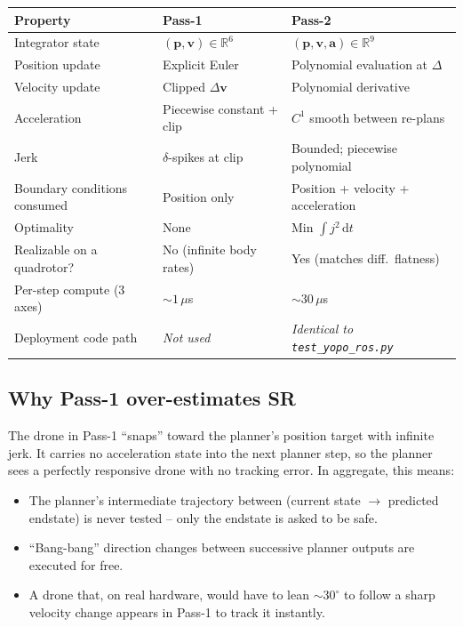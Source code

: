 \documentclass[11pt]{article}
\newcommand{\R}{\mathbb{R}}
\newcommand{\dt}{\,\mathrm{d}t}
\begin{document}
\begin{center}
\begin{tabular}{lll}
\hline
Property & Pass-1 & Pass-2 \\
\hline
Integrator state                & $(\bm{p}, \bm{v}) \in \R^6$ & $(\bm{p}, \bm{v}, \bm{a}) \in \R^9$ \\
Position update                 & Explicit Euler & Polynomial evaluation at $\Delta$ \\
Velocity update                 & Clipped $\Delta\bm{v}$ & Polynomial derivative \\
Acceleration                    & Piecewise constant + clip & $C^1$ smooth between re-plans \\
Jerk                            & $\delta$-spikes at clip   & Bounded; piecewise polynomial \\
Boundary conditions consumed    & Position only            & Position + velocity + acceleration \\
Optimality                      & None                     & Min $\int j^2 \dt$ \\
Realizable on a quadrotor?      & No (infinite body rates) & Yes (matches diff.\ flatness) \\
Per-step compute (3 axes)       & ${\sim}1\,\mu$s          & ${\sim}30\,\mu$s \\
Deployment code path            & \emph{Not used}          & \emph{Identical to \texttt{test\_yopo\_ros.py}} \\
\hline
\end{tabular}
\end{center}

\subsection{Why Pass-1 over-estimates SR}

The drone in Pass-1 ``snaps'' toward the planner's position target with infinite jerk.  It carries no acceleration state into the next planner step, so the planner sees a perfectly responsive drone with no tracking error.  In aggregate, this means:

\begin{itemize}
  \item The planner's intermediate trajectory between (current state $\to$ predicted endstate) is never tested -- only the endstate is asked to be safe.
  \item ``Bang-bang'' direction changes between successive planner outputs are executed for free.
  \item A drone that, on real hardware, would have to lean ${\sim}30^\circ$ to follow a sharp velocity change appears in Pass-1 to track it instantly.
\end{itemize}
\end{document}

